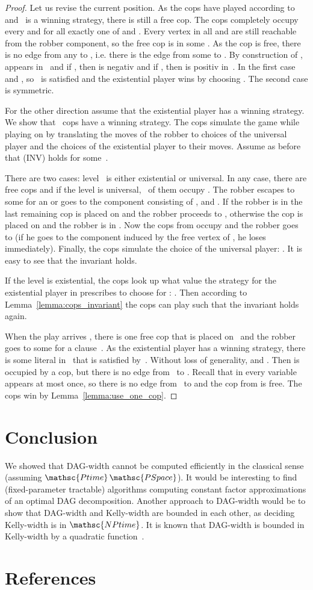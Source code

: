 \documentclass[authoryear]{article}
\makeatletter
\theoremstyle{definition}
\newcommand{\0}{\emptyset}
\newcommand{\ptime}{\ensuremath{\mathsc{Ptime}}\xspace}
\newcommand{\pspace}{\ensuremath{\mathsc{PSpace}}\xspace}
\newcommand{\nptime}{\ensuremath{\mathsc{NPtime}}\xspace}
\newcommand{\dagw}{DAG-{}width\xspace}
\newcommand{\kw}{Kelly-{}width\xspace}
\newcommand{\ie}{i.e.\@\xspace}
\makeatother
\begin{document}
\begin{proof}
Let us revise the current position. As the cops have played according to~
and~ is a winning strategy, there is still a free cop. The cops completely 
occupy every  and for all
 exactly one of  and . Every vertex in all
 and  are still reachable from the robber component, so the free cop
is in some . As the cop is free, there is no edge from any
 to , \ie there is the edge from some  to
. By construction of ,  appears
in~ and if , then  is negativ and if , then
 is positiv in~. In the first case  and
, so~ is satisfied and the existential
player wins by choosing . The second case is
symmetric.

For the other direction assume that the existential player has a winning 
strategy. We show that~ cops have a winning strategy. The cops simulate 
the game  while playing on  by translating the moves of 
the 
robber to choices of the universal player and the choices of the existential 
player to their moves. Assume as before that (INV) holds for
some~.

There are two cases: level~ is either existential or universal. In any
case, there are  free cops and if the level is universal,~ of
them occupy . The robber escapes to some  for an
 or goes to the component consisting of ,  and
. If the robber is in  the last remaining cop is
placed on  and the robber proceeds to
, otherwise the cop is
placed on  and the robber is in
. Now the cops from 
occupy  and the robber goes to  (if he goes to the
component induced by the free vertex of , he loses
immediately). Finally, the cops simulate the choice of the universal player:
. It is easy to see that the invariant holds.

If the level is existential, the cops look up what value the strategy for the 
existential player in  prescribes to choose for 
: . Then according to 
Lemma~\ref{lemma:cops_invariant} the cops can play such that the invariant 
holds again.

When the play arrives , there is one free cop that is placed on~ and 
the robber goes to some  for a clause~. As the existential player has a 
winning strategy, there is some literal  in~ that is satisfied 
by~. Without loss of generality,  and . Then 
 is occupied by a cop, but there is no edge from~ to 
. Recall that in  every variable appears at most once, so 
there is no edge from~ to  and the cop from  is 
free. The cops win by Lemma~\ref{lemma:use_one_cop}.
\end{proof}



\section{Conclusion}
We showed that \dagw cannot be computed efficiently in the classical
sense (assuming \ptime\pspace).  It would be interesting to
find (fixed-parameter tractable) algorithms computing constant factor
approximations of an optimal DAG decomposition. Another approach to
\dagw would be to show that \dagw and \kw are bounded in each other,
as deciding \kw is in \nptime. It is known that \dagw is
bounded in \kw by a quadratic function~\cite{KaiserKreRabSie14}.


\section*{References}


\end{document}
